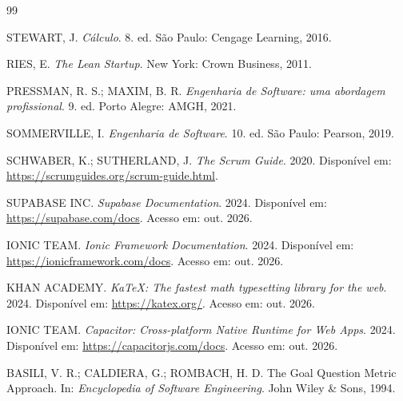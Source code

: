 \documentclass[12pt, a4paper]{article}
\begin{document}
\begin{thebibliography}{99}

STEWART, J. \textit{C\'{a}lculo}. 8. ed. S\~{a}o Paulo: Cengage Learning, 2016.

RIES, E. \textit{The Lean Startup}. New York: Crown Business, 2011.

PRESSMAN, R. S.; MAXIM, B. R. \textit{Engenharia de Software: uma abordagem profissional}. 9. ed. Porto Alegre: AMGH, 2021.

SOMMERVILLE, I. \textit{Engenharia de Software}. 10. ed. S\~{a}o Paulo: Pearson, 2019.

SCHWABER, K.; SUTHERLAND, J. \textit{The Scrum Guide}. 2020. Dispon\'{i}vel em: \url{https://scrumguides.org/scrum-guide.html}.

SUPABASE INC. \textit{Supabase Documentation}. 2024. Dispon\'{i}vel em: \url{https://supabase.com/docs}. Acesso em: out. 2026.

IONIC TEAM. \textit{Ionic Framework Documentation}. 2024. Dispon\'{i}vel em: \url{https://ionicframework.com/docs}. Acesso em: out. 2026.

KHAN ACADEMY. \textit{KaTeX: The fastest math typesetting library for the web}. 2024. Dispon\'{i}vel em: \url{https://katex.org/}. Acesso em: out. 2026.

IONIC TEAM. \textit{Capacitor: Cross-platform Native Runtime for Web Apps}. 2024. Dispon\'{i}vel em: \url{https://capacitorjs.com/docs}. Acesso em: out. 2026.

BASILI, V. R.; CALDIERA, G.; ROMBACH, H. D. The Goal Question Metric Approach. In: \textit{Encyclopedia of Software Engineering}. John Wiley \& Sons, 1994.

\end{thebibliography}

\newpage
\appendix
\end{document}
